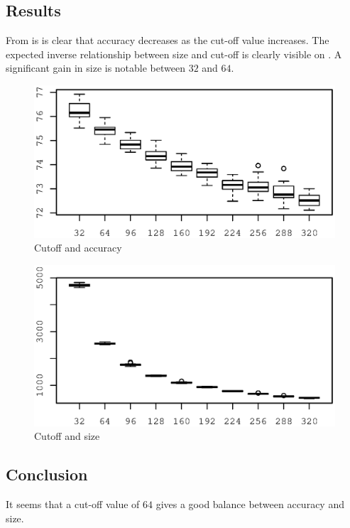\subsection{Results}
From  is is clear that accuracy decreases as the cut-off value increases.  The expected inverse relationship between size and cut-off is clearly visible  on .  A significant gain in size is notable between $32$ and $64$. 
\begin{figure} 
\center
\includegraphics{artifacts/c4-026acc.eps}
\caption{Cutoff and accuracy}
\label{fig:c4-026-a}
\end{figure}
\begin{figure} 
\center
\includegraphics{artifacts/c4-026size.eps}
\caption{Cutoff and size}
\label{fig:c4-026-s}
\end{figure}
\subsection{Conclusion}
It seems that a cut-off value of $64$ gives a good balance between accuracy and size.

